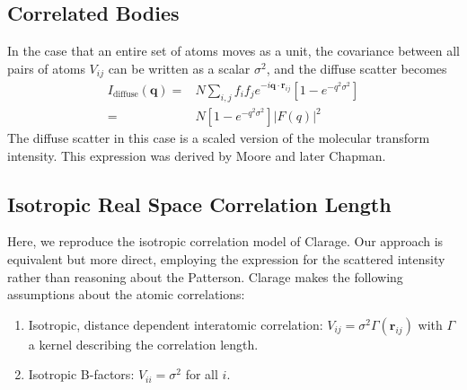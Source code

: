 \documentclass{article}
\begin{document}
\subsection{Correlated Bodies}
In the case that an entire set of atoms moves as a unit, the covariance between all pairs of atoms $V_{ij}$ can be written as a scalar $\sigma^2$, and the diffuse scatter becomes
\begin{align}
I_\mathrm{diffuse} (\mathbf{q}) =&
N \sum\limits_{i,j} f_i f_j e^{-i \mathbf{q} \cdot \mathbf{r}_{ij}} 
\left[ 1 - e^{- q^2 \sigma^2} \right] 
\nonumber \\ 
%
=& N \left[ 1 - e^{- q^2 \sigma^2} \right] |F(q)|^2
\end{align}
The diffuse scatter in this case is a scaled version of the molecular transform intensity. This expression was derived by Moore and later Chapman.


\subsection{Isotropic Real Space Correlation Length}
Here, we reproduce the isotropic correlation model of Clarage. Our approach is equivalent but more direct, employing the expression for the scattered intensity rather than reasoning about the Patterson. Clarage makes the following assumptions about the atomic correlations:
%
\begin{enumerate}

\item Isotropic, distance dependent interatomic correlation: 
$V_{ij} = \sigma^2 \Gamma(\mathbf{r}_{ij}) $ with $\Gamma$ a kernel describing the correlation length.

\item Isotropic B-factors: $V_{ii} = \sigma^2$ for all $i$.

\end{enumerate}
\end{document}
